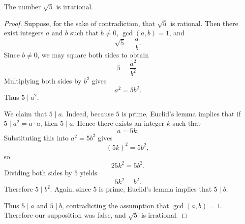 \begin{theorem}
The number $\sqrt{5}$ is irrational.
\end{theorem}

\begin{proof}
Suppose, for the sake of contradiction, that $\sqrt{5}$ is rational. Then there exist integers $a$ and $b$ such that $b \neq 0$, $\gcd(a,b)=1$, and
\[
\sqrt{5}=\frac{a}{b}.
\]
Since $b \neq 0$, we may square both sides to obtain
\[
5=\frac{a^2}{b^2}.
\]
Multiplying both sides by $b^2$ gives
\[
a^2=5b^2.
\]
Thus $5 \mid a^2$.

We claim that $5 \mid a$. Indeed, because $5$ is prime, Euclid's lemma implies that if $5 \mid a^2=a\cdot a$, then $5 \mid a$. Hence there exists an integer $k$ such that
\[
a=5k.
\]
Substituting this into $a^2=5b^2$ gives
\[
(5k)^2=5b^2,
\]
so
\[
25k^2=5b^2.
\]
Dividing both sides by $5$ yields
\[
5k^2=b^2.
\]
Therefore $5 \mid b^2$. Again, since $5$ is prime, Euclid's lemma implies that $5 \mid b$.

Thus $5 \mid a$ and $5 \mid b$, contradicting the assumption that $\gcd(a,b)=1$. Therefore our supposition was false, and $\sqrt{5}$ is irrational.
\end{proof}
